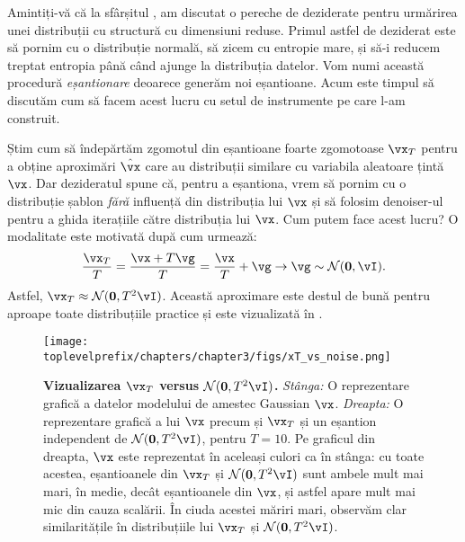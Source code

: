 \documentclass[../../book-main_ro.tex]{subfiles}
\begin{document}
Amintiți-vă că la sfârșitul , am discutat o pereche de deziderate pentru urmărirea unei distribuții cu structură cu dimensiuni reduse. Primul astfel de deziderat este să pornim cu o distribuție normală, să zicem cu entropie mare, și să-i reducem treptat entropia până când ajunge la distribuția datelor. Vom numi această procedură \textit{eșantionare} deoarece generăm noi eșantioane. Acum este timpul să discutăm cum să facem acest lucru cu setul de instrumente pe care l-am construit.

Știm cum să îndepărtăm zgomotul din eșantioane foarte zgomotoase \(\vx_{T}\) pentru a obține aproximări \(\hat{\vx}\) care au distribuții similare cu variabila aleatoare țintă \(\vx\). Dar dezideratul spune că, pentru a eșantiona, vrem să pornim cu o distribuție șablon \textit{fără} influență din distribuția lui \(\vx\) și să folosim denoiser-ul pentru a ghida iterațiile către distribuția lui \(\vx\). Cum putem face acest lucru? O modalitate este motivată după cum urmează:
\begin{equation}\label{eq:ve_converge_to_large_gaussian}
	\frac{\vx_{T}}{T} = \frac{\vx + T\vg}{T} = \frac{\vx}{T} + \vg \to \vg \sim \dNorm(\vzero, \vI).
\end{equation}
Astfel, \(\vx_{T} \approx \dNorm(\vzero, T^{2}\vI)\). Această aproximare este destul de bună pentru aproape toate distribuțiile practice și este vizualizată în .

\begin{figure}[!htbp]
	\centering 
	\texttt{[image: \\toplevelprefix/chapters/chapter3/figs/xT\_vs\_noise.png]}
	\caption{\small\textbf{Vizualizarea \(\vx_{T}\) versus \(\dNorm(\vzero, T^{2}\vI)\).} \textit{Stânga:} O reprezentare grafică a datelor modelului de amestec Gaussian \(\vx\). \textit{Dreapta:} O reprezentare grafică a lui \(\vx\) precum și \(\vx_{T}\) și un eșantion independent de \(\dNorm(\vzero, T^{2}\vI)\), pentru \(T = 10\). Pe graficul din dreapta, \(\vx\) este reprezentat în aceleași culori ca în stânga: cu toate acestea, eșantioanele din \(\vx_{T}\) și \(\dNorm(\vzero, T^{2}\vI)\) sunt ambele mult mai mari, în medie, decât eșantioanele din \(\vx\), și astfel apare mult mai mic din cauza scalării. În ciuda acestei măriri mari, observăm clar similaritățile în distribuțiile lui \(\vx_{T}\) și \(\dNorm(\vzero, T^{2}\vI)\).}
	\label{fig:xT_vs_noise}
\end{figure}
\end{document}
